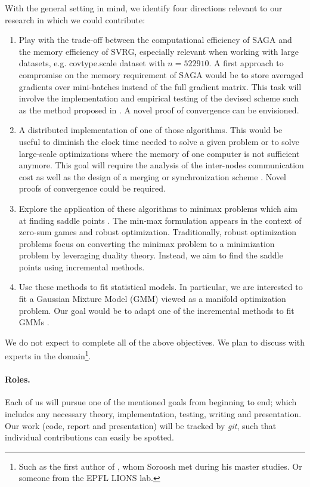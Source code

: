 \documentclass[a4paper,11pt]{article}
\begin{document}
With the general setting in mind, we identify four directions relevant to our
research in which we could contribute:
\begin{enumerate}
	\setlength{\itemsep}{0pt} \setlength{\parskip}{0pt}
	\item Play with the trade-off between the computational efficiency of SAGA
		and the memory efficiency of SVRG, especially relevant when working with
		large datasets, e.g. covtype.scale dataset with $n=522910$. A first approach to compromise on the
		memory requirement of SAGA would be to store averaged gradients over
		mini-batches instead of the full gradient matrix. This task will involve
		the implementation and empirical testing of the devised scheme such as the method proposed in \cite{nitanda2014stochastic}. A novel
		proof of convergence can be envisioned.
	\item A distributed implementation of one of those algorithms. This would be
		useful to diminish the clock time needed to solve a given problem or to
		solve large-scale optimizations where the memory of one computer is not
		sufficient anymore. This goal will require the analysis of the
		inter-nodes communication cost as well as the design of a merging or
		synchronization scheme \cite{bianchi2014coordinate}. Novel proofs of convergence could be required.
	\item Explore the application of these algorithms to minimax problems which
		aim at finding saddle points \cite{nemirovski2009robust}. The min-max formulation appears in the
		context of zero-sum games and robust optimization. Traditionally, robust
		optimization problems focus on converting the minimax problem to a
		minimization problem by leveraging duality theory. Instead, we aim to
		find the saddle points using incremental methods.
	\item Use these methods to fit statistical models. In particular, we are
		interested to fit a Gaussian Mixture Model (GMM) viewed as a manifold
		optimization problem. Our goal would be to adapt one of the incremental
		methods to fit GMMs \cite{reshad_matrix_2015}.
\end{enumerate}
We do not expect to complete all of the above objectives. We plan to discuss with experts in the domain\footnote{Such as the
first author of \cite{reshad_matrix_2015}, whom Soroosh met during his master
studies. Or someone from the EPFL LIONS lab.}.

\paragraph{Roles.}
Each of us will pursue one of the mentioned goals from beginning to end; which
includes any necessary theory, implementation, testing, writing and
presentation. Our work (code, report and presentation) will be tracked by
\textit{git}, such that individual contributions can easily be spotted.
\end{document}
